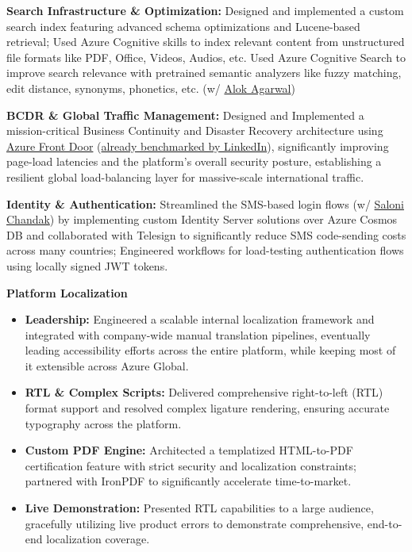 \documentclass[a4paper,11pt]{article}
\begin{document}
\vspace{2mm}
\item \textbf{Search Infrastructure \& Optimization:} Designed and implemented a custom search index featuring advanced schema optimizations and Lucene-based retrieval; Used Azure Cognitive skills to index relevant content from unstructured file formats like PDF, Office, Videos, Audios, etc. Used Azure Cognitive Search to improve search relevance with pretrained semantic analyzers like fuzzy matching, edit distance, synonyms, phonetics, etc. (w/ \href{https://www.linkedin.com/in/alok-agrawal-iima/}{Alok Agarwal})
\vspace{1mm}
\item \textbf{BCDR \& Global Traffic Management:} Designed and Implemented a mission-critical Business Continuity and Disaster Recovery architecture using \href{https://azure.microsoft.com/en-us/products/frontdoor}{Azure Front Door} (\href{https://www.linkedin.com/blog/engineering/scalability/linkedin-scales-edge-with-azure-front-door}{already benchmarked by LinkedIn}), significantly improving page-load latencies and the platform’s overall security posture, establishing a resilient global load-balancing layer for massive-scale international traffic.
\vspace{1mm}
\item \textbf{Identity \& Authentication:} Streamlined the SMS-based login flows (w/ \href{https://www.linkedin.com/in/saloni-chandak-46553454/}{Saloni Chandak}) by implementing custom Identity Server solutions over Azure Cosmos DB and collaborated with Telesign to significantly reduce SMS code-sending costs across many countries; Engineered workflows for load-testing authentication flows using locally signed JWT tokens.
\vspace{2mm}
\item \textbf{Platform Localization}
\begin{itemize}[label=\tiny$\circ$, leftmargin=1em, itemsep=1.0mm]
    \item \textbf{Leadership:} Engineered a scalable internal localization framework and integrated with company-wide manual translation pipelines, eventually leading accessibility efforts across the entire platform, while keeping most of it extensible across Azure Global.
    \item \textbf{RTL \& Complex Scripts:} Delivered comprehensive right-to-left (RTL) format support and resolved complex ligature rendering, ensuring accurate typography across the platform.
    \item \textbf{Custom PDF Engine:} Architected a templatized HTML-to-PDF certification feature with strict security and localization constraints; partnered with IronPDF to significantly accelerate time-to-market.
    \item \textbf{Live Demonstration:} Presented RTL capabilities to a large audience, gracefully utilizing live product errors to demonstrate comprehensive, end-to-end localization coverage.
  \end{itemize}
\end{document}
